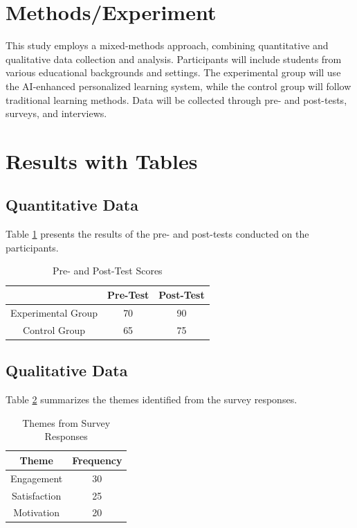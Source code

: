 \documentclass{article}
\begin{document}
\section{Methods/Experiment}
This study employs a mixed-methods approach, combining quantitative and qualitative data collection and analysis. Participants will include students from various educational backgrounds and settings. The experimental group will use the AI-enhanced personalized learning system, while the control group will follow traditional learning methods. Data will be collected through pre- and post-tests, surveys, and interviews.

\section{Results with Tables}
\subsection{Quantitative Data}
Table \ref{tab:quantitative} presents the results of the pre- and post-tests conducted on the participants.

\begin{table}[ht]
\centering
\begin{tabular}{|c|c|c|}
\hline
& Pre-Test & Post-Test \\
\hline
Experimental Group & 70 & 90 \\
Control Group & 65 & 75 \\
\hline
\end{tabular}
\caption{Pre- and Post-Test Scores}
\label{tab:quantitative}
\end{table}

\subsection{Qualitative Data}
Table \ref{tab:qualitative} summarizes the themes identified from the survey responses.

\begin{table}[ht]
\centering
\begin{tabular}{|c|c|}
\hline
Theme & Frequency \\
\hline
Engagement & 30 \\
Satisfaction & 25 \\
Motivation & 20 \\
\hline
\end{tabular}
\caption{Themes from Survey Responses}
\label{tab:qualitative}
\end{table}
\end{document}
